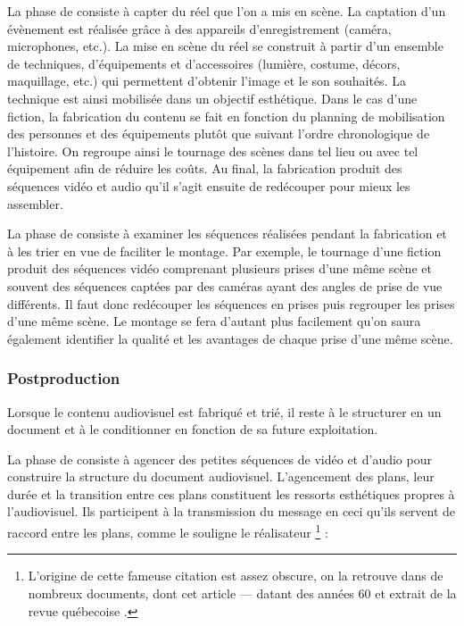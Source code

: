 La phase de  consiste à capter du réel que l'on a mis en scène. La captation d'un évènement est réalisée grâce à des appareils d'enregistrement (caméra, microphones, etc.). 
La mise en scène du réel se construit à partir d'un ensemble de techniques, d'équipements et d'accessoires (lumière, costume, décors, maquillage, etc.) qui permettent d'obtenir l'image et le son souhaités. 
La technique est ainsi mobilisée dans un objectif esthétique. 
Dans le cas d'une fiction, la fabrication du contenu se fait en fonction du planning de mobilisation des personnes et des équipements plutôt que suivant l'ordre chronologique de l'histoire. 
On regroupe ainsi le tournage des scènes dans tel lieu ou avec tel équipement afin de réduire les coûts. Au final, la fabrication
produit des séquences vidéo et audio qu'il s'agit ensuite de redécouper pour mieux les assembler.

La phase de  consiste à examiner les séquences réalisées pendant la fabrication et à les trier en vue de faciliter le montage. 
Par exemple, le tournage d'une fiction produit des séquences vidéo comprenant plusieurs prises d'une même scène et souvent des séquences captées par des caméras ayant des angles de prise de vue différents. 
Il faut donc redécouper les séquences en prises puis regrouper les prises d'une même scène. 
Le montage se fera d'autant plus facilement qu'on saura également identifier la qualité et les avantages de chaque prise d'une même scène.


\subsubsection*{Postproduction}
Lorsque le contenu audiovisuel est fabriqué et trié, il reste à le structurer en un document et à le conditionner en fonction de sa future exploitation.

La phase de  consiste à agencer des petites séquences de vidéo et d'audio pour construire la structure du document audiovisuel.
L'agencement des plans, leur durée et la transition entre ces plans constituent les ressorts esthétiques propres à l'audiovisuel. 
Ils participent à la transmission du message en ceci qu'ils servent de raccord entre les plans, comme le souligne le réalisateur \footnote{L'origine de cette fameuse citation est assez obscure, on la retrouve dans de nombreux documents, dont cet article --\cite{Montage et Réalisme}-- datant des années 60 et extrait de la revue québecoise .} :

